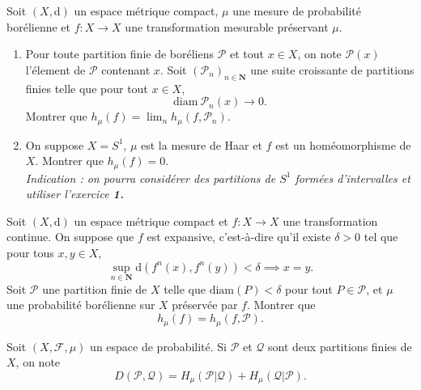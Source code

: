 \documentclass[a4paper,10pt,openany]{article}
\theoremstyle{plain}
\theoremstyle{definition}
\newcommand{\dd}{\mathrm{d}}
\newcommand{\N}{\mathbf{N}}
\begin{document}
\vspace{0.6cm}


 \vspace{1.5mm} 

\noindent Soit $(X, \dd)$ un espace m\'etrique compact, $\mu$ une mesure de probabilit\'e bor\'elienne et $f : X \to X$ une transformation mesurable pr\'eservant $\mu$.
\begin{enumerate}
\item Pour toute partition finie de bor\'eliens $\mathcal{P}$ et tout $x \in X$, on note $\mathcal{P}(x)$ l'\'element de $\mathcal{P}$ contenant $x$. Soit $(\mathcal{P}_n)_{n \in \N}$ une suite croissante de partitions finies telle que pour tout $x \in X$,
$$
\mathrm{diam}~ \mathcal{P}_n(x) \to 0.
$$
Montrer que $h_\mu(f) = \lim_n h_\mu(f, \mathcal{P}_n).$
\item On suppose $X = S^1$, $\mu$ est la mesure de Haar et $f$ est un hom\'eomorphisme de $X$. Montrer que $h_\mu(f) = 0$. \\
\textit{Indication : on pourra consid\'erer des partitions de $S^1$ form\'ees d'intervalles et utiliser l'exercice \textbf{1.}}
\end{enumerate}

\vspace{0.6cm}


 \vspace{1.5mm} 

\noindent Soit $(X,\dd)$ un espace m\'etrique compact et $f : X \to X$ une transformation continue. On suppose que $f$ est expansive, c'est-\`a-dire qu'il existe $\delta > 0$ tel que pour tous $x,y \in X$,
$$
\sup_{n \in \N} \dd(f^n(x), f^n(y)) < \delta \implies x = y.
$$
Soit $\mathcal{P}$ une partition finie de $X$ telle que $\mathrm{diam}(P) < \delta$ pour tout $P \in \mathcal{P}$, et $\mu$ une probabilit\'e bor\'elienne sur $X$ pr\'eserv\'ee par $f$. Montrer que 
$$
h_\mu(f) = h_\mu(f, \mathcal{P}).
$$

\vspace{0.6cm}

 \vspace{1.5mm}

\noindent Soit $(X, \mathcal{F}, \mu)$ un espace de probabilit\'e. Si $\mathcal{P}$ et $\mathcal{Q}$ sont deux partitions finies de $X$, on note
$$
D(\mathcal{P}, \mathcal{Q}) = H_\mu(\mathcal{P}|\mathcal{Q}) + H_\mu(\mathcal{Q}|\mathcal{P}).
$$
\end{document}
